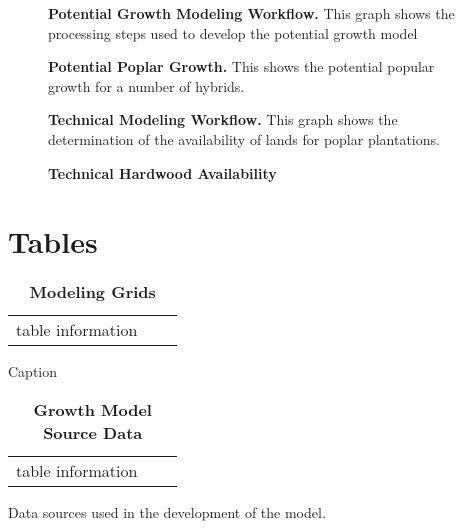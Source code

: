 \documentclass[10pt]{article}
\begin{document}
\begin{figure}[!ht]
\begin{center}
\vspace*{4cm}
\end{center}
\caption{ {\bf Potential Growth Modeling Workflow.} This graph shows the processing steps used to develop the potential growth model }
\label{fig:growth-model}
\end{figure}

\begin{figure}[!ht]
\begin{center}
\vspace*{4cm}
\end{center}
\caption{ {\bf Potential Poplar Growth.} This shows the potential popular growth for a number of hybrids.  }
\label{fig:growth-map}
\end{figure}


\begin{figure}[!ht]
\begin{center}
\vspace*{4cm}
\end{center}
\caption{ {\bf Technical Modeling Workflow.} This graph shows the determination of the availability of lands for poplar plantations.  }
\label{fig:tech-model}
\end{figure}

\begin{figure}[!ht]
\begin{center}
\vspace*{4cm}

\end{center}
\caption{ {\bf Technical Hardwood Availability}  }
\label{fig:tech-map}
\end{figure}


\section*{Tables}
\begin{table}[!ht]
\caption{
\bf{Modeling Grids}}
\begin{tabular}{|c|c|c|}
table information
\end{tabular}
\begin{flushleft}Caption
\end{flushleft}
\label{tab:}
 \end{table}

\begin{table}[!ht]
\caption{
\bf{Growth Model Source Data}}
\begin{tabular}{|c|c|c|}
table information
\end{tabular}
\begin{flushleft}Data sources used in the development of the model.
\end{flushleft}
\label{tab:data}
 \end{table}
\end{document}
